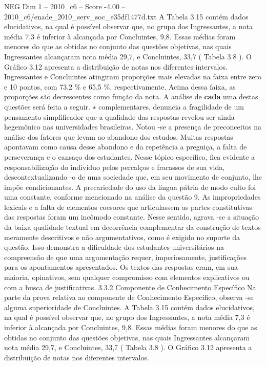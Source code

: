 \begin{textsample}{NEG Dim 1 – 2010\_c6 – Score -4.00 – 2010\_c6/enade\_2010\_serv\_soc\_e35df1477d.txt}
A Tabela 3.15 contém dados elucidativos, na qual é possível observar que, no grupo dos Ingressantes, a nota média 7,3 é inferior à alcançada por Concluintes, 9,8.
Essas médias foram menores do que as obtidas no conjunto das questões objetivas, nas quais Ingressantes alcançaram nota média 29,7, e Concluintes, 33,7 ( Tabela 3.8 ).
O Gráfico 3.12 apresenta a distribuição de notas nos diferentes intervalos.
Ingressantes e Concluintes atingiram proporções mais elevadas na faixa entre zero e 10 pontos, com 73,2 \% e 65,5 \%, respectivamente.
Acima dessa faixa, as proporções são decrescentes como função da nota.
A análise de \textbf{cada} uma destas questões será feita a seguir. ∗ complementares, denuncia a fragilidade de um pensamento simplificador que a qualidade das respostas revelou ser ainda hegemônico nas universidades brasileiras.
Notou -se a presença de preconceitos na análise dos fatores que levam ao abandono dos estudos.
Muitas respostas apontavam como causa desse abandono e da repetência a preguiça, a falta de perseverança e o cansaço dos estudantes.
Nesse tópico específico, fica evidente a responsabilização do indivíduo pelos percalços e fracassos de sua vida, descontextualizando -o de uma sociedade que, em seu movimento de conjunto, lhe impõe condicionantes.
A precariedade do uso da língua pátria de modo culto foi uma constante, conforme mencionado na análise da questão 9.
As impropriedades lexicais e a falta de elementos coesores que articulassem as partes constitutivas das respostas foram um incômodo constante.
Nesse sentido, agrava -se a situação da baixa qualidade textual em decorrência complementar da construção de textos meramente descritivos e não argumentativos, como é exigido no suporte da questão.
Isso demonstra a dificuldade dos estudantes universitários na compreensão de que uma argumentação requer, imperiosamente, justificações para os apontamentos apresentados.
Os textos das respostas eram, em sua maioria, opinativos, sem qualquer compromisso com elementos explicativos ou com a busca de justificativas. 3.3.2 Componente de Conhecimento Específico Na parte da prova relativa ao componente de Conhecimento Específico, observa -se alguma superioridade de Concluintes.
A Tabela 3.15 contém dados elucidativos, na qual é possível observar que, no grupo dos Ingressantes, a nota média 7,3 é inferior à alcançada por Concluintes, 9,8.
Essas médias foram menores do que as obtidas no conjunto das questões objetivas, nas quais Ingressantes alcançaram nota média 29,7, e Concluintes, 33,7 ( Tabela 3.8 ).
O Gráfico 3.12 apresenta a distribuição de notas nos diferentes intervalos.

\end{textsample}
